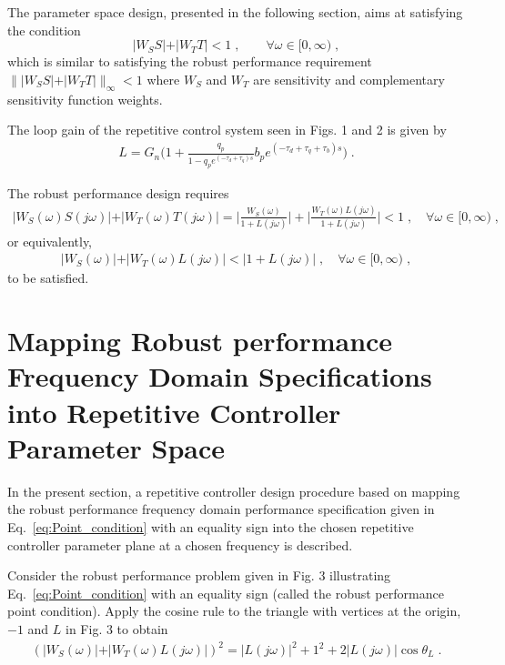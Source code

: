 \documentclass[12pt,draftcls,onecolumn]{IEEEtran}
\begin{document}
The parameter space design, presented in the following section, aims at satisfying the condition
\begin{equation}
	\vert W_{S}S \vert + \vert W_{T}T \vert < 1\;, \qquad \forall\omega\in [0,\infty ) \;,
	\label{eq:Robust_performance_stability}
\end{equation}
which is similar to satisfying the robust performance requirement $\parallel\vert W_{S}S \vert + \vert W_{T}T \vert\parallel_{\infty}<1$ where $W_{S}$ and $W_{T}$ are sensitivity and complementary sensitivity function weights.

The loop gain of the repetitive control system seen in Figs. 1 and 2 is given by
\begin{align}
	L=G_{n}\Big(1+\frac{q_{p}}{1-q_{p}e^{(-\tau_d+\tau_q)s}}b_{p}e^{(-\tau_d+\tau_q+\tau_{b})s}\Big) \;.
\end{align}

The robust performance design requires
\begin{align}
	\vert W_{S}(\omega)S(j\omega) \vert + \vert W_{T}(\omega)T(j\omega) \vert =
	\bigg\vert \frac{W_{S}(\omega)}{1+L(j\omega)} \bigg\vert + \bigg\vert \frac{W_{T}(\omega)L(j\omega)}{1+L(j\omega)} \bigg\vert < 1 \;,
\quad \forall\omega\in [0,\infty ) \;,
\label{eq:Point_condition_v2}
\end{align}
or equivalently,
\begin{align}
	\vert W_{S}(\omega) \vert + \vert W_{T}(\omega)L(j\omega) \vert < \vert 1+L(j\omega) \vert \;, \quad \forall\omega\in [0,\infty )\;,
	\label{eq:Point_condition}
\end{align}
to be satisfied.


\section{Mapping Robust performance Frequency Domain Specifications into Repetitive Controller Parameter Space}

In the present section, a repetitive controller design procedure based on mapping the robust performance frequency domain performance specification given in Eq.~\eqref{eq:Point_condition} with an equality sign into the chosen repetitive controller parameter plane at a chosen frequency is described.

Consider the robust performance problem given in Fig. 3 illustrating Eq.~\eqref{eq:Point_condition} with an equality sign (called the robust performance point condition). Apply the cosine rule to the triangle with vertices at the origin, $-1$ and $L$ in Fig. 3 to obtain
\begin{align}
	( \vert W_{S}(\omega) \vert + \vert W_{T}(\omega)L(j\omega) \vert )^{2} = \vert L(j\omega) \vert^2 + 1^2 + 2\vert L(j\omega)\vert \cos{\theta_{L}} \;. \label{eq:QuadraticEquation}
\end{align}
\end{document}
